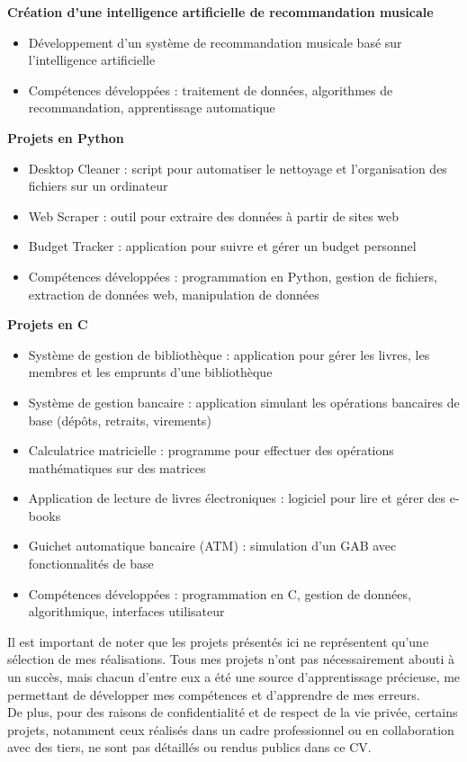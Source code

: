 \documentclass{article}
\begin{document}
\textbf{Création d'une intelligence artificielle de recommandation musicale}
\begin{itemize}
\item Développement d'un système de recommandation musicale basé sur l'intelligence artificielle
\item Compétences développées : traitement de données, algorithmes de recommandation, apprentissage automatique
\end{itemize}

\textbf{Projets en Python}
\begin{itemize}
\item Desktop Cleaner : script pour automatiser le nettoyage et l'organisation des fichiers sur un ordinateur
\item Web Scraper : outil pour extraire des données à partir de sites web
\item Budget Tracker : application pour suivre et gérer un budget personnel
\item Compétences développées : programmation en Python, gestion de fichiers, extraction de données web, manipulation de données
\end{itemize}

\textbf{Projets en C}
\begin{itemize}
\item Système de gestion de bibliothèque : application pour gérer les livres, les membres et les emprunts d'une bibliothèque
\item Système de gestion bancaire : application simulant les opérations bancaires de base (dépôts, retraits, virements)
\item Calculatrice matricielle : programme pour effectuer des opérations mathématiques sur des matrices
\item Application de lecture de livres électroniques : logiciel pour lire et gérer des e-books
\item Guichet automatique bancaire (ATM) : simulation d'un GAB avec fonctionnalités de base
\item Compétences développées : programmation en C, gestion de données, algorithmique, interfaces utilisateur
\end{itemize}

Il est important de noter que les projets présentés ici ne représentent qu'une sélection de mes réalisations. Tous mes projets n'ont pas nécessairement abouti à un succès, mais chacun d'entre eux a été une source d'apprentissage précieuse, me permettant de développer mes compétences et d'apprendre de mes erreurs.\\
De plus, pour des raisons de confidentialité et de respect de la vie privée, certains projets, notamment ceux réalisés dans un cadre professionnel ou en collaboration avec des tiers, ne sont pas détaillés ou rendus publics dans ce CV.
\end{document}
